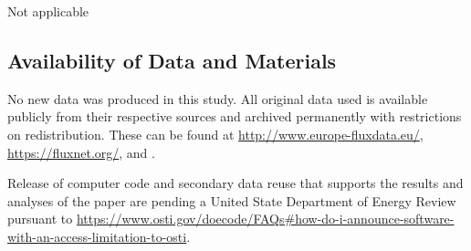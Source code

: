 \documentclass{article}
\begin{document}
Not applicable

\subsection*{Availability of Data and Materials}

No new data was produced in this study. All original data used is available publicly from their respective sources and archived permanently with restrictions on redistribution. These can be found at \url{http://www.europe-fluxdata.eu/}, \url{https://fluxnet.org/}, and \citep{cleverly2011alice}.

Release of computer code and secondary data reuse that supports the results and analyses of the paper are pending a United State Department of Energy Review pursuant to \url{https://www.osti.gov/doecode/FAQs#how-do-i-announce-software-with-an-access-limitation-to-osti}.
\end{document}
